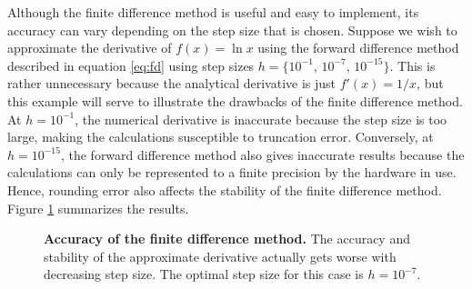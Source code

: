 Although the finite difference method is useful and easy to implement, its 
accuracy can vary depending on the step size that is chosen. Suppose we wish
to approximate the derivative of $f(x)=\ln x$ using the forward difference 
method described in equation \eqref{eq:fd} using step sizes $h=\{10^{-1},\,
10^{-7},\,10^{-15}\}$. This is rather unnecessary because the analytical 
derivative is just $f'(x) = 1/x$, but this example will serve to illustrate 
the drawbacks of the finite difference method. At $h=10^{-1}$, the numerical
derivative is inaccurate because the step size is too large, making the 
calculations susceptible to truncation error. Conversely, at $h=10^{-15}$, 
the forward difference method also gives inaccurate results because the 
calculations can only be represented to a finite precision by the hardware 
in use. Hence, rounding error also affects the stability of the finite 
difference method. Figure \ref{fig:fd-accuracy} summarizes the results.
\begin{figure}[H]
    \centering
    
    \caption{\textbf{Accuracy of the finite difference method.} The accuracy
    and stability of the approximate derivative actually gets worse with 
    decreasing step size. The optimal step size for this case is 
    $h=10^{-7}$.}
    \label{fig:fd-accuracy}
\end{figure}

